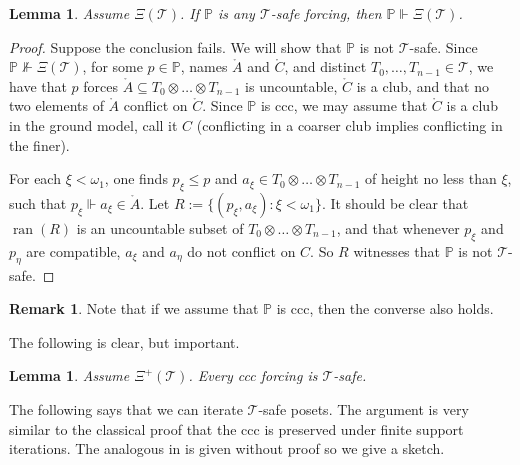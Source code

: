 \documentclass[a4paper,noamsfonts]{amsart}
\newtheorem{lemma}[theorem]{Lemma}
\theoremstyle{definition}
\newtheorem{remark}[theorem]{Remark}
\renewcommand{\P}{\mathbb {P}}
\newcommand{\seb}{\subseteq}
\newcommand{\dt}[1]{\mathring{#1}}
\newcommand{\forces}{\Vdash}
\newcommand{\1}{\mathbbm{1}}
\newcommand{\T}{\mathcal{T}}
\newcommand{\prop}{\Xi}
\newcommand{\propp}{\prop^{+}}
\DeclareMathOperator{\ran}{ran}
\begin{document}
\begin{lemma}\label{lem:safe-preserves}
  Assume $\prop(\T)$. If $\P$ is any $\T$-safe
  forcing, then $\P \forces \prop(\T)$.
\end{lemma}
\begin{proof}
  Suppose the conclusion fails. We will show that $\P$ is not $\T$-safe.
  Since $\P \not\forces \prop(\T)$, for
  some $p \in \P$, names $\dt{A}$ and $\dt{C}$, and distinct $T_{0},\dots,
  T_{n-1} \in \T$, we have that
  $p$ forces $\dt{A} \seb T_{0} \otimes \dots \otimes T_{n-1}$
  is uncountable, $\dt{C}$ is a club,
  and that no two elements of $\dt{A}$ conflict on $\dt{C}$. Since $\P$ is
  ccc, we may assume that $\dt{C}$ is a club in the ground model,
  call it $C$ (conflicting in a coarser club implies conflicting in the
  finer).

  For each $\xi < \omega_{1}$, one finds $p_{\xi} \le p$ and
  $a_{\xi} \in T_{0}\otimes \dots \otimes T_{n-1}$ of height no less than
  $\xi$, such that $p_{\xi}\forces a_{\xi} \in \dt{A}$. Let
  $R := \{(p_{\xi},a_{\xi}) : \xi < \omega_{1}\}$. It should be clear
  that $\ran(R)$ is an uncountable subset of
  $T_{0}\otimes \dots \otimes T_{n-1}$, and that whenever $p_{\xi}$ and $p_{\eta}$
  are compatible, $a_{\xi}$ and $a_{\eta}$ do not conflict on $C$.
  So $R$ witnesses that $\P$ is not $\T$-safe.
\end{proof}

\begin{remark}\label{rmk:converse-if-ccc}
  Note that if we assume that $\P$ is ccc, then the converse also holds.
\end{remark}

The following is clear, but important.

\begin{lemma}\label{lem:psi+-safe}
  Assume $\propp(\T)$. Every ccc forcing
  is $\T$-safe.
\end{lemma}

The following says that we can iterate $\T$-safe posets. The argument
is very similar to the classical proof that the ccc is preserved under
finite support iterations. The analogous
in \cite{ShelahAbraham} is given without proof so we give a sketch.
\end{document}

